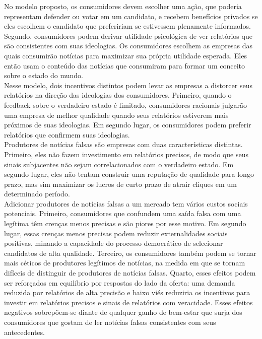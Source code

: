 No modelo proposto, os consumidores devem escolher uma ação, que poderia
representam defender ou votar em um candidato, e recebem benefícios privados se
eles escolhem o candidato que prefeririam se estivessem plenamente informados. Segundo,
consumidores podem derivar utilidade psicológica de ver relatórios que são consistentes
com suas ideologias. Os consumidores escolhem as empresas das quais consumirão notícias
para maximizar sua própria utilidade esperada. Eles então usam o conteúdo das notícias que consumiram para formar um conceito sobre o estado do mundo. \\

Nesse modelo, dois incentivos distintos podem levar as empresas a distorcer seus relatórios na direção das ideologias dos consumidores. Primeiro, quando o feedback sobre o verdadeiro estado é limitado,
consumidores racionais julgarão uma empresa de melhor qualidade quando seus relatórios estiverem mais próximos
de suas ideologias. Em segundo lugar, os consumidores podem preferir relatórios que confirmem suas ideologias. \\

Produtores de notícias falsas são empresas com duas características distintas. Primeiro, eles não fazem
investimento em relatórios precisos, de modo que seus sinais subjacentes não sejam correlacionados com
o verdadeiro estado. Em segundo lugar, eles não tentam construir uma reputação de qualidade para longo prazo, mas sim maximizar os lucros de curto prazo de atrair cliques em um determinado período. \\

Adicionar produtores de notícias falsas a um mercado tem vários custos sociais potenciais. Primeiro,
consumidores que confundem uma saída falsa com uma legítima têm crenças menos precisas
e são piores por esse motivo. Em segundo lugar, essas crenças menos precisas podem reduzir
externalidades sociais positivas, minando a capacidade do processo democrático de
selecionar candidatos de alta qualidade. Terceiro, os consumidores também podem se tornar mais céticos
de produtores legítimos de notícias, na medida em que se tornam difíceis de distinguir
de produtores de notícias falsas. Quarto, esses efeitos podem ser reforçados em equilíbrio por
respostas do lado da oferta: uma demanda reduzida por relatórios de alta precisão e baixo viés
reduziria os incentivos para investir em relatórios precisos e sinais de relatórios com veracidade.
Esses efeitos negativos sobrepõem-se diante de qualquer ganho de bem-estar que surja dos consumidores
que gostam de ler notícias falsas consistentes com seus antecedentes.


